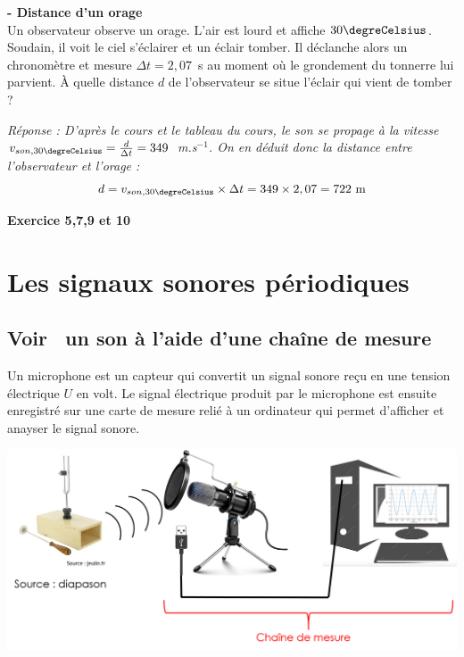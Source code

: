 \begin{mdframed}[style=autreexo]
\textbf{ - Distance d'un orage}\\
Un observateur observe un orage. L'air est lourd et affiche $30\degreCelsius$. Soudain, il voit le ciel s'éclairer et un éclair tomber. Il déclanche alors un chronomètre et mesure $\Delta t = 2,07$~s au moment où le grondement du tonnerre lui parvient. \`{A} quelle distance $d$ de l'observateur se situe l'éclair qui vient de tomber ?
\end{mdframed}
\textit{Réponse : D'après le cours et le tableau du cours, le son se propage à la vitesse $v_{son,30\degreCelsius}=\frac{d}{\Delta t}=349$~m.s$^{-1}$. On en déduit donc la distance entre l'observateur et l'orage :
\begin{equation*}
    d = v_{son,30\degreCelsius}\times \Delta t = 349\times 2,07 = 722~\text{m}
\end{equation*}}
\begin{Large}
\end{Large}\textbf{Exercice 5,7,9 et 10}

\section{Les signaux sonores périodiques}
\subsection{\og Voir \fg ~un son à l'aide d'une chaîne de mesure}
\begin{tcolorbox}[colback=green!5!white,colframe=green!75!black,title=\textbf{Microphone et enregistrement:}]
Un microphone est un capteur qui convertit un signal sonore reçu en une tension électrique $U$ en volt. Le signal électrique produit par le microphone est ensuite enregistré sur une carte de mesure relié à un ordinateur qui permet d'afficher et anayser le signal sonore.
\begin{center}
    \includegraphics[scale = 0.5]{Images/Cours/Chapitre_3/Chaine_mesure.png}
\end{center}
\end{tcolorbox}
